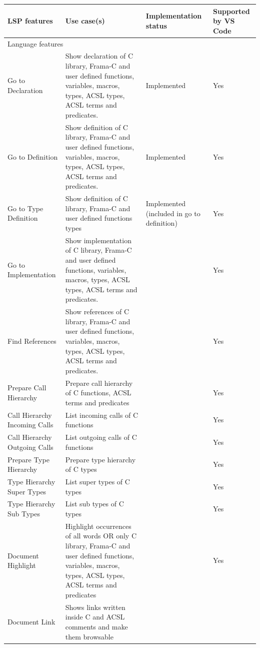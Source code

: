 \documentclass[10pt]{article}
\begin{document}
\begin{singlespace}
\begin{longtable}[H]{|p{3cm}|p{6cm}|p{3cm}|p{2cm}|}
	\hline
	\textbf{LSP features} &
	  \textbf{Use case(s)} &
	  \textbf{Implementation status} &
	  \textbf{Supported by VS Code} \\ \hline
	\multicolumn{4}{|l|}{Language features} \\ \hline
	Go to Declaration &
	  Show declaration of C library, Frama-C and user defined functions, variables, macros, types, ACSL types, ACSL terms and predicates.
	  & Implemented & 
	  Yes \\ \hline
	Go to Definition &
	  Show definition of C library, Frama-C and user defined functions, variables, macros, types, ACSL types, ACSL terms and predicates.
	  & Implemented &
	  Yes \\ \hline
	Go to Type Definition &
	  Show definition of C library, Frama-C and user defined functions types
	  & Implemented (included in go to definition) &
	  Yes \\ \hline
	Go to Implementation &
	  Show implementation of C library, Frama-C and user defined functions, variables, macros, types, ACSL types, ACSL terms and predicates.
	  & & 
	  Yes \\ \hline
	Find References &
	  Show references of C library, Frama-C and user defined functions, variables, macros, types, ACSL types, ACSL terms and predicates.
	  & & 
	  Yes \\ \hline
	Prepare Call Hierarchy &
	  Prepare call hierarchy of C functions, ACSL terms and predicates
	  & & 
	  Yes \\ \hline
	Call Hierarchy Incoming Calls &
	  List incoming calls of C functions
	  & & 
	  Yes \\ \hline
	Call Hierarchy Outgoing Calls &
	  List outgoing calls of C functions
	  & & 
	  Yes \\ \hline
	Prepare Type Hierarchy &
	  Prepare type hierarchy of C types
	  & & 
	  Yes \\ \hline
	Type Hierarchy Super Types &
	  List super types of C types
	  & & 
	  Yes \\ \hline
	Type Hierarchy Sub Types &
	  List sub types of C types
	  & & 
	  Yes \\ \hline
	Document Highlight &
	  Highlight occurrences of all words OR only C library, Frama-C and user defined functions, variables, macros, types, ACSL types, ACSL terms and predicates
	  & & 
	  Yes \\ \hline
	Document Link &
	  Shows links written inside C and ACSL comments and make them browsable

\end{longtable}
\end{singlespace}
\end{document}
